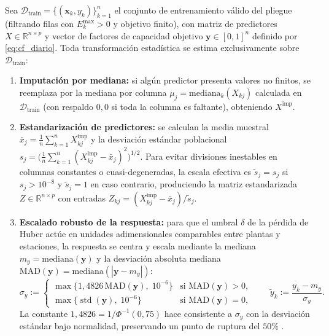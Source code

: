 Sea $\mathcal{D}_{\mathrm{train}} = \{(\mathbf{x}_k, y_k)\}_{k=1}^n$ el conjunto de entrenamiento válido del pliegue (filtrando filas con $E^{\max}_{k} > 0$ y objetivo finito), con matriz de predictores $X \in \mathbb{R}^{n \times p}$ y vector de factores de capacidad objetivo $\mathbf{y} \in [0,1]^n$ definido por \eqref{eq:cf_diario}. Toda transformación estadística se estima exclusivamente sobre $\mathcal{D}_{\mathrm{train}}$:
\begin{enumerate}
    \item \textbf{Imputación por mediana:} si algún predictor presenta valores no finitos, se reemplaza por la mediana por columna $\mu_j = \mathrm{mediana}_k(X_{kj})$ calculada en $\mathcal{D}_{\mathrm{train}}$ (con respaldo $0{,}0$ si toda la columna es faltante), obteniendo $X^{\mathrm{imp}}$.
    \item \textbf{Estandarización de predictores:} se calculan la media muestral $\bar{x}_j = \frac{1}{n}\sum_{k=1}^n X^{\mathrm{imp}}_{kj}$ y la desviación estándar poblacional $s_j = \big(\frac{1}{n}\sum_{k=1}^n (X^{\mathrm{imp}}_{kj} - \bar{x}_j)^2\big)^{1/2}$. Para evitar divisiones inestables en columnas constantes o cuasi-degeneradas, la escala efectiva es $\tilde{s}_j = s_j$ si $s_j > 10^{-8}$ y $\tilde{s}_j = 1$ en caso contrario, produciendo la matriz estandarizada $Z \in \mathbb{R}^{n \times p}$ con entradas $Z_{kj} = (X^{\mathrm{imp}}_{kj} - \bar{x}_j)/\tilde{s}_j$.
    \item \textbf{Escalado robusto de la respuesta:} para que el umbral $\delta$ de la pérdida de Huber actúe en unidades adimensionales comparables entre plantas y estaciones, la respuesta se centra y escala mediante la mediana $m_y = \mathrm{mediana}(\mathbf{y})$ y la desviación absoluta mediana $\mathrm{MAD}(\mathbf{y}) = \mathrm{mediana}(|\mathbf{y} - m_y|)$:
    \begin{equation}
    \sigma_y := \begin{cases}
    \max\{1{,}4826\,\mathrm{MAD}(\mathbf{y}),\; 10^{-6}\} & \text{si } \mathrm{MAD}(\mathbf{y}) > 0, \\
    \max\{\operatorname{std}(\mathbf{y}),\; 10^{-6}\} & \text{si } \mathrm{MAD}(\mathbf{y}) = 0,
    \end{cases}
    \qquad
    \tilde{y}_k := \frac{y_k - m_y}{\sigma_y}.
    \label{eq:mad_scale}
    \end{equation}
    La constante $1{,}4826 = 1/\Phi^{-1}(0{,}75)$ hace consistente a $\sigma_y$ con la desviación estándar bajo normalidad, preservando un punto de ruptura del $50\%$ \cite{rousseeuw1993mad}.
\end{enumerate}

